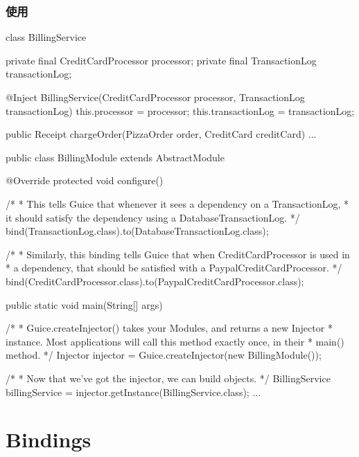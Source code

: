 \subsubsection{使用}

\begin{Java}[使用@Inject来告诉Guice通过构造函数构造]
class BillingService {
  private final CreditCardProcessor processor;
  private final TransactionLog transactionLog;

  @Inject
  BillingService(CreditCardProcessor processor, 
      TransactionLog transactionLog) {
    this.processor = processor;
    this.transactionLog = transactionLog;
  }

  public Receipt chargeOrder(PizzaOrder order, CreditCard creditCard) {
    ...
  }
}
\end{Java}

\begin{Java}[通过AbstractModule的子类来配置binding]
public class BillingModule extends AbstractModule {
  @Override 
  protected void configure() {

     /*
      * This tells Guice that whenever it sees a dependency on a TransactionLog,
      * it should satisfy the dependency using a DatabaseTransactionLog.
      */
    bind(TransactionLog.class).to(DatabaseTransactionLog.class);

     /*
      * Similarly, this binding tells Guice that when CreditCardProcessor is used in
      * a dependency, that should be satisfied with a PaypalCreditCardProcessor.
      */
    bind(CreditCardProcessor.class).to(PaypalCreditCardProcessor.class);
  }
}
\end{Java}

\begin{Java}
 public static void main(String[] args) {
    /*
     * Guice.createInjector() takes your Modules, and returns a new Injector
     * instance. Most applications will call this method exactly once, in their
     * main() method.
     */
    Injector injector = Guice.createInjector(new BillingModule());

    /*
     * Now that we've got the injector, we can build objects.
     */
    BillingService billingService = injector.getInstance(BillingService.class);
    ...
  }
\end{Java}

\section{Bindings}

